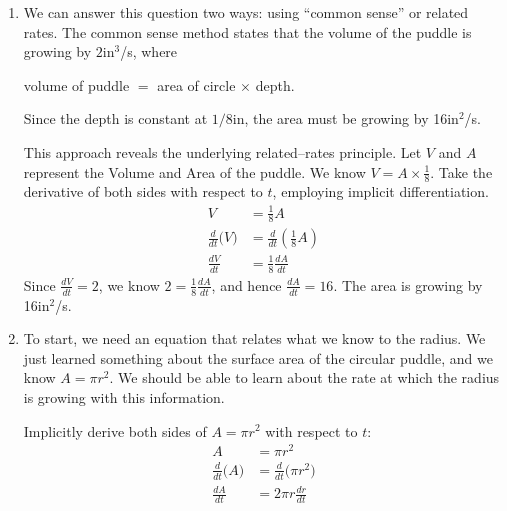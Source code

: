 {\begin{enumerate}
\item We can answer this question two ways: using ``common sense'' or related rates. The common sense method states that the volume of the puddle is growing by $2$in$^3$/s, where 
	\begin{center} volume of puddle $=$ area of circle $\times$ depth.\end{center}
Since the depth is constant at $1/8$in, the area must be growing by 16in$^2$/s.

This approach reveals the underlying related--rates principle. Let $V$ and $A$ represent the Volume and Area of the puddle. We know $V= A\times \frac18$. Take the derivative of both sides with respect to $t$, employing implicit differentiation.
\begin{align*}
V &= \frac18A\\
\frac{d}{dt}\big(V\big) &= \frac{d}{dt}\left(\frac18A\right)\\
\frac{dV}{dt} &=	\frac18\frac{dA}{dt}
\end{align*} 
Since $\frac{dV}{dt} = 2$, we know $2 = \frac18\frac{dA}{dt}$, and hence $\frac{dA}{dt} = 16$. The area is growing by 16in$^2$/s.

\drawexampleline
\item		To start, we need an equation that relates what we know to the radius. We just learned something about the surface area of the circular puddle, and we know $A = \pi r^2$. We should be able to learn about the rate at which the radius is growing with this information. 

Implicitly derive both sides of $A=\pi r^2$ with respect to $t$:
\begin{align*}
	A 	&= \pi r^2 \\
	\frac{d}{dt}\big(A\big) &= \frac{d}{dt}\big(\pi r^2\big)\\
	\frac{dA}{dt} &= 2\pi r\frac{dr}{dt}
\end{align*}


\end{enumerate}}
